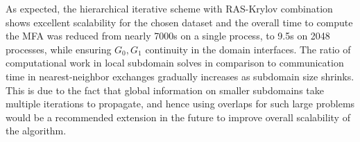 As expected, the hierarchical iterative scheme with RAS-Krylov combination shows excellent scalability for the chosen dataset and the overall time to compute the MFA was reduced from nearly 7000s on a single process,  to 9.5s on 2048 processes, while ensuring $G_0, G_1$ continuity in the domain interfaces. The ratio of computational work in local subdomain solves in comparison to communication time in nearest-neighbor exchanges gradually increases as subdomain size shrinks. This is due to the fact that global information on smaller subdomains take multiple iterations to propagate, and hence using overlaps for such large problems would be a recommended extension in the future to improve overall scalability of the algorithm.




